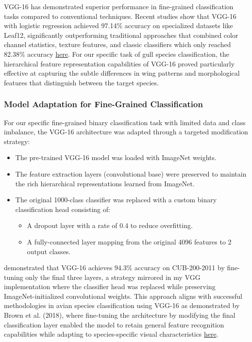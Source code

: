 \documentclass[a4paper,12pt]{report}
\begin{document}
VGG-16 has demonstrated superior performance in fine-grained classification tasks compared to conventional techniques. Recent studies show that VGG-16 with logistic regression achieved 97.14\% accuracy on specialized datasets like Leaf12, significantly outperforming traditional approaches that combined color channel statistics, texture features, and classic classifiers which only reached 82.38\% accuracy \href{https://doi.org/10.3233/JIFS-169911}{here}. For our specific task of gull species classification, the hierarchical feature representation capabilities of VGG-16 proved particularly effective at capturing the subtle differences in wing patterns and morphological features that distinguish between the target species.

\subsubsection{Model Adaptation for Fine-Grained Classification}

For our specific fine-grained binary classification task with limited data and class imbalance, the VGG-16 architecture was adapted through a targeted modification strategy:

\begin{itemize}
    \item The pre-trained VGG-16 model was loaded with ImageNet weights.
    \item The feature extraction layers (convolutional base) were preserved to maintain the rich hierarchical representations learned from ImageNet.
    \item The original 1000-class classifier was replaced with a custom binary classification head consisting of: 
    \begin{itemize}
        \item A dropout layer with a rate of 0.4 to reduce overfitting.
        \item A fully-connected layer mapping from the original 4096 features to 2 output classes.
    \end{itemize}
\end{itemize}

\citep{zhang2019bird} demonstrated that VGG-16 achieves 94.3\% accuracy on CUB-200-2011 by fine-tuning only the final three layers, a strategy mirrored in my VGG implementation where the classifier head was replaced while preserving ImageNet-initialized convolutional weights.
This approach aligns with successful methodologies in avian species classification using VGG-16 as demonstrated by Brown et al. (2018), where fine-tuning the architecture by modifying the final classification layer enabled the model to retain general feature recognition capabilities while adapting to species-specific visual characteristics \href{https://ieeexplore.ieee.org/stamp/stamp.jsp?tp=&arnumber=10533638&tag=}{here}.
\end{document}
